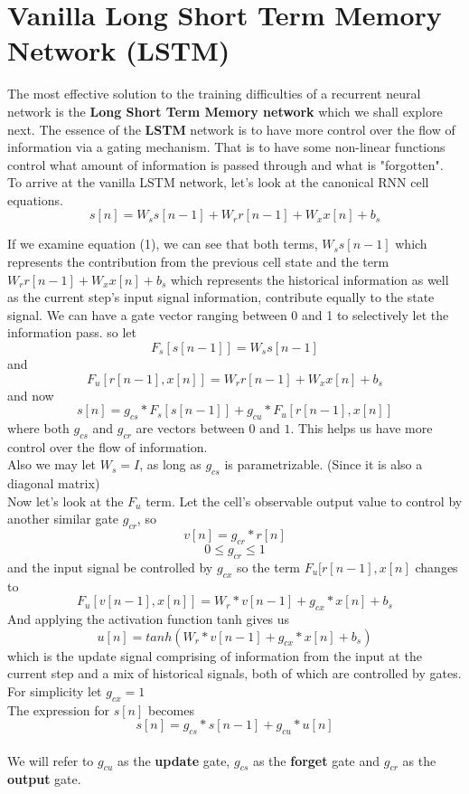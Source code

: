 \documentclass[12pt,letterpaper]{article}
\begin{document}
\section{Vanilla Long Short Term Memory Network (LSTM)}
The most effective solution to the training difficulties of a recurrent neural network is the \textbf{Long Short Term Memory network} which we shall explore next.
The essence of the \textbf{LSTM} network is to have more control over the flow of information via a gating mechanism. That is to have some non-linear functions control what amount of information is passed through and what is "forgotten".
\\
To arrive at the vanilla LSTM network, let's look at the canonical RNN cell equations.
\[
s[n] = W_{s}s[n-1]+W_{r}r[n-1]+W_{x}x[n]+b_{s}\tag{17}
\]


If we examine equation (1), we can see that both terms,
$W_{s}s[n-1]$ which represents the contribution from the previous cell state and the term $W_{r}r[n-1]+W_{x}x[n]+b_{s}$ which represents the historical information as well as the current step's input signal information, contribute equally to the state signal.
We can have a gate vector ranging between 0 and 1 to selectively let the information pass.
so let
\[
F_{s}[s[n-1]] = W_{s}s[n-1]\tag{18}
\]
and \[
F_{u}[r[n-1],x[n]]  = W_{r}r[n-1]+W_{x}x[n]+b_{s}\tag{19}
\]
and now
\[
s[n] = g_{cs}*F_{s}[s[n-1]] + g_{cu}*F_{u}[r[n-1],x[n]]\tag{20}
\]
where both $g_{cs}$ and $g_{cr}$ are vectors between $0$ and $1$.
This helps us have more control over the flow of information.
\\
Also we may let $W_{s} = I$, as long as $g_{cs}$ is parametrizable. (Since it is also a diagonal matrix)
\\
Now let's look at the $F_{u}$ term.
Let the cell's observable output value to control by another similar gate $g_{cr}$, so
\[
v[n] = g_{cr}*r[n]\tag{21}
\]
\[
0 \leq g_{cr} \leq 1\tag{22}
\]
and the input signal be controlled by $g_{cx}$
so the term $F_{u}[r[n-1],x[n]$ changes to 
\[
F_{u}[v[n-1],x[n]] = W_{r}*v[n-1]+ g_{cx}*x[n]+ b_{s}\tag{23}
\]
And applying the activation function tanh gives us
\[
u[n] = tanh(W_{r}*v[n-1]+ g_{cx}*x[n]+ b_{s})\tag{24}
\]
which is the update signal comprising of information from the input at the current step and a mix of historical signals, both of which are controlled by gates.
For simplicity let $g_{cx} = 1$
\\
The expression for $s[n]$ becomes
\[
s[n] = g_{cs}*s[n-1] + g_{cu}*u[n]\tag{25}
\]
\\
We will refer to $g_{cu}$ as the \textbf{update} gate,
$g_{cs}$ as the \textbf{forget} gate and
$g_{cr}$ as the \textbf{output} gate.
\end{document}
